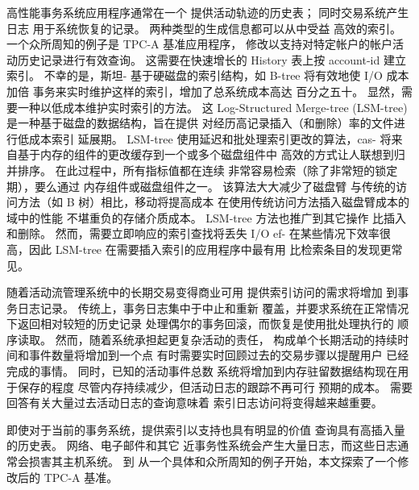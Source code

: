 高性能事务系统应用程序通常在一个
提供活动轨迹的历史表； 同时交易系统产生日志
用于系统恢复的记录。 两种类型的生成信息都可以从中受益
高效的索引。 一个众所周知的例子是 TPC-A 基准应用程序，
修改以支持对特定帐户的帐户活动历史记录进行有效查询。
这需要在快速增长的 History 表上按 account-id 建立索引。 不幸的是，斯坦-
基于硬磁盘的索引结构，如 B-tree 将有效地使 I/O 成本加倍
事务来实时维护这样的索引，增加了总系统成本高达
百分之五十。 显然，需要一种以低成本维护实时索引的方法。 这
Log-Structured Merge-tree (LSM-tree) 是一种基于磁盘的数据结构，旨在提供
对经历高记录插入（和删除）率的文件进行低成本索引
延展期。 LSM-tree 使用延迟和批处理索引更改的算法，cas-
将来自基于内存的组件的更改缓存到一个或多个磁盘组件中
高效的方式让人联想到归并排序。 在此过程中，所有指标值都在连续
非常容易检索（除了非常短的锁定期），要么通过
内存组件或磁盘组件之一。 该算法大大减少了磁盘臂
与传统的访问方法（如 B 树）相比，移动将提高成本
在使用传统访问方法插入磁盘臂成本的域中的性能
不堪重负的存储介质成本。 LSM-tree 方法也推广到其它操作
比插入和删除。 然而，需要立即响应的索引查找将丢失 I/O ef-
在某些情况下效率很高，因此 LSM-tree 在需要插入索引的应用程序中最有用
比检索条目的发现更常见。 

随着活动流管理系统中的长期交易变得商业可用
  提供索引访问的需求将增加
到事务日志记录。 传统上，事务日志集中于中止和重新
覆盖，并要求系统在正常情况下返回相对较短的历史记录
处理偶尔的事务回滚，而恢复是使用批处理执行的
顺序读取。 然而，随着系统承担起更复杂活动的责任，
构成单个长期活动的持续时间和事件数量将增加到一个点
有时需要实时回顾过去的交易步骤以提醒用户
已经完成的事情。 同时，已知的活动事件总数
系统将增加到内存驻留数据结构现在用于保存的程度
尽管内存持续减少，但活动日志的跟踪不再可行
预期的成本。 需要回答有关大量过去活动日志的查询意味着
索引日志访问将变得越来越重要。

即使对于当前的事务系统，提供索引以支持也具有明显的价值
查询具有高插入量的历史表。 网络、电子邮件和其它
近事务性系统会产生大量日志，而这些日志通常会损害其主机系统。 到
从一个具体和众所周知的例子开始，本文探索了一个修改后的 TPC-A 基准。

